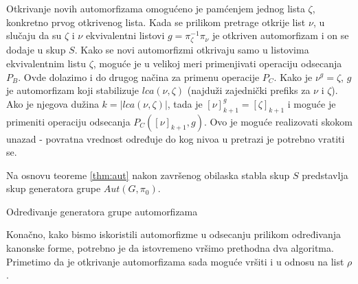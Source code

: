\documentclass[12pt,oneside]{memoir}
\theoremstyle{definition}
\begin{document}
  Otkrivanje novih automorfizama omogućeno je pamćenjem jednog lista $\zeta$,
  konkretno prvog otkrivenog lista. Kada se prilikom pretrage otkrije list
  $\nu$, u slučaju da su $\zeta$ i $\nu$ ekvivalentni listovi $g =
  \pi_\zeta^{-1} \pi_\nu$ je otkriven automorfizam i on se dodaje u skup $S$.
  Kako se novi automorfizmi otkrivaju samo u listovima ekvivalentnim listu
  $\zeta$, moguće je u velikoj meri primenjivati operaciju odsecanja $P_B$.
  Ovde dolazimo i do drugog načina za primenu operacije $P_C$. Kako je $\nu^g =
  \zeta$, $g$ je automorfizam koji stabilizuje $lca(\nu, \zeta)$ (najduži
  zajednički prefiks za $\nu$ i $\zeta$). Ako je njegova dužina $k = |lca(\nu,
  \zeta)|$, tada je $[\nu]_{k+1}^g = [\zeta]_{k+1}$ i moguće je primeniti
  operaciju odsecanja $P_C([\nu]_{k+1}, g)$. Ovo je moguće realizovati skokom
  unazad - povratna vrednost određuje do kog nivoa u pretrazi je potrebno
  vratiti se.

  Na osnovu teoreme \ref{thm:aut} nakon završenog obilaska stabla skup $S$
  predstavlja skup generatora grupe $Aut(G, \pi_0)$.

  \begin{algorithm}[H]
	  \caption{Određivanje generatora grupe automorfizama}
	  \begin{algorithmic}[1]
			\State \Return {$|\nu|$}
		  \EndIf
					\State {}
				\EndIf
			\EndIf
		  \EndFor
			\If {$\zeta = ()$}
				\State {$\zeta \gets \nu$}
			\EndIf

				\State {}
			\EndIf
		  \EndIf
		  \State \Return{$|\nu|$}
		  \EndProcedure
	  \end{algorithmic}
  \end{algorithm}

  Konačno, kako bismo iskoristili automorfizme u odsecanju prilikom određivanja
  kanonske forme, potrebno je da istovremeno vršimo prethodna dva algoritma.
  Primetimo da je otkrivanje automorfizama sada moguće vršiti i u odnosu na
  list $\rho$.
\end{document}
